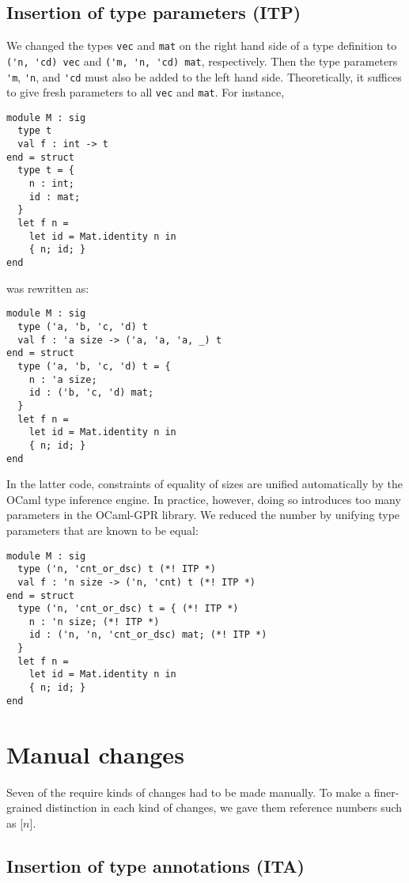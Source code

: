 \documentclass[10pt,a4paper]{article}
\begin{document}
\subsection{Insertion of type parameters (ITP)}
\label{sec:ITP}

We changed the types \lstinline|vec| and \lstinline|mat| on the right hand side of a type
definition to \lstinline|('n, 'cd) vec| and \lstinline|('m, 'n, 'cd) mat|, respectively.
Then the type parameters \lstinline|'m|, \lstinline|'n|, and \lstinline|'cd|
must also be added to the left hand side.
Theoretically, it suffices to give fresh parameters to all \lstinline|vec| and \lstinline|mat|.
For instance,
\begin{lstlisting}
module M : sig
  type t
  val f : int -> t
end = struct
  type t = {
    n : int;
    id : mat;
  }
  let f n =
    let id = Mat.identity n in
    { n; id; }
end
\end{lstlisting}
was rewritten as:
\begin{lstlisting}
module M : sig
  type ('a, 'b, 'c, 'd) t
  val f : 'a size -> ('a, 'a, 'a, _) t
end = struct
  type ('a, 'b, 'c, 'd) t = {
    n : 'a size;
    id : ('b, 'c, 'd) mat;
  }
  let f n =
    let id = Mat.identity n in
    { n; id; }
end
\end{lstlisting}
In the latter code, constraints of equality of sizes are unified automatically
by the OCaml type inference engine. In practice, however, doing so
introduces too many parameters in the OCaml-GPR library. We reduced the number by
unifying type parameters that are known to be equal:
\begin{lstlisting}
module M : sig
  type ('n, 'cnt_or_dsc) t (*! ITP *)
  val f : 'n size -> ('n, 'cnt) t (*! ITP *)
end = struct
  type ('n, 'cnt_or_dsc) t = { (*! ITP *)
    n : 'n size; (*! ITP *)
    id : ('n, 'n, 'cnt_or_dsc) mat; (*! ITP *)
  }
  let f n =
    let id = Mat.identity n in
    { n; id; }
end
\end{lstlisting}

\section{Manual changes}
\label{sec:manual-changes}

Seven of the require kinds of changes had to be made manually.
To make a finer-grained distinction in each kind of changes, we gave them reference numbers such as [$n$].

\subsection{Insertion of type annotations (ITA)}
\label{sec:ITA}
\end{document}
